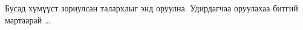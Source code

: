 
\begin{acknowledgements}
\addchaptertocentry{\acknowledgementname}

Бусад хүмүүст зориулсан талархлыг энд оруулна. Удирдагчаа оруулахаа битгий мартаарай \ldots

\end{acknowledgements}

